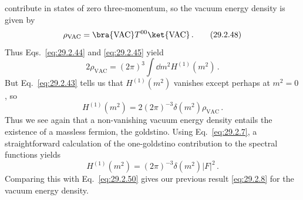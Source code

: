 contribute in states of zero three-momentum, so the vacuum energy density
is given by
\begin{equation}
  \rho_{\mathrm{VAC}}
  =\bra{\mathrm{VAC}} T^{00}\ket{\mathrm{VAC}}\,.
  \tag{29.2.48}\label{eq:29.2.48}
\end{equation}
Thus Eqs.~\eqref{eq:29.2.44} and \eqref{eq:29.2.45} yield
\begin{equation}
  2\rho_{\mathrm{VAC}}
  =(2\pi)^3\int \dd m^2H^{(1)}(m^2)\,.
  \tag{29.2.49}\label{eq:29.2.49}
\end{equation}
But Eq.~\eqref{eq:29.2.43} tells us that \(H^{(1)}(m^2)\) vanishes
except perhaps at \(m^2=0\), so
\begin{equation}
  H^{(1)}(m^2)
  =2(2\pi)^{-3}\delta(m^2)\rho_{\mathrm{VAC}}\,.
  \tag{29.2.50}\label{eq:29.2.50}
\end{equation}
Thus we see again that a non-vanishing vacuum energy density entails the
existence of a massless fermion, the goldstino. Using Eq.~\eqref{eq:29.2.7},
a straightforward calculation of the one-goldstino contribution to the
spectral functions yields
\begin{equation}
  H^{(1)}(m^2)
  =(2\pi)^{-3}\delta(m^2)\lvert F\rvert^2\,.
  \tag{29.2.51}\label{eq:29.2.51}
\end{equation}
Comparing this with Eq.~\eqref{eq:29.2.50} gives our previous result
\eqref{eq:29.2.8} for the vacuum energy density.
